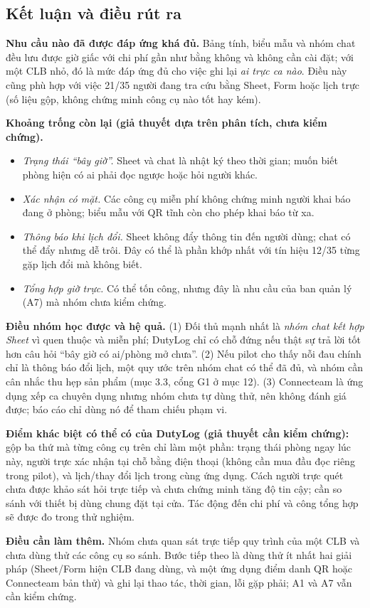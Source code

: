 \subsection{Kết luận và điều rút ra}
\textbf{Nhu cầu nào đã được đáp ứng khá đủ.} Bảng tính, biểu mẫu và nhóm chat đều lưu được giờ giấc với chi phí gần như bằng không và không cần cài đặt; với một CLB nhỏ, đó là mức đáp ứng đủ cho việc ghi lại \emph{ai trực ca nào}. Điều này cũng phù hợp với việc 21/35 người đang tra cứu bằng Sheet, Form hoặc lịch trực (số liệu gộp, không chứng minh công cụ nào tốt hay kém).

\textbf{Khoảng trống còn lại (giả thuyết dựa trên phân tích, chưa kiểm chứng).}
\begin{itemize}[nosep]
\item \emph{Trạng thái ``bây giờ''.} Sheet và chat là nhật ký theo thời gian; muốn biết phòng hiện có ai phải đọc ngược hoặc hỏi người khác.
\item \emph{Xác nhận có mặt.} Các công cụ miễn phí không chứng minh người khai báo đang ở phòng; biểu mẫu với QR tĩnh còn cho phép khai báo từ xa.
\item \emph{Thông báo khi lịch đổi.} Sheet không đẩy thông tin đến người dùng; chat có thể đẩy nhưng dễ trôi. Đây có thể là phần khớp nhất với tín hiệu 12/35 từng gặp lịch đổi mà không biết.
\item \emph{Tổng hợp giờ trực.} Có thể tốn công, nhưng đây là nhu cầu của ban quản lý (A7) mà nhóm chưa kiểm chứng.
\end{itemize}

\textbf{Điều nhóm học được và hệ quả.} (1) Đối thủ mạnh nhất là \emph{nhóm chat kết hợp Sheet} vì quen thuộc và miễn phí; DutyLog chỉ có chỗ đứng nếu thật sự trả lời tốt hơn câu hỏi ``bây giờ có ai/phòng mở chưa''. (2) Nếu pilot cho thấy nỗi đau chính chỉ là thông báo đổi lịch, một quy ước trên nhóm chat có thể đã đủ, và nhóm cần cân nhắc thu hẹp sản phẩm (mục 3.3, cổng G1 ở mục 12). (3) Connecteam là ứng dụng xếp ca chuyên dụng nhưng nhóm chưa tự dùng thử, nên không đánh giá được; báo cáo chỉ dùng nó để tham chiếu phạm vi.

\textbf{Điểm khác biệt có thể có của DutyLog (giả thuyết cần kiểm chứng):} gộp ba thứ mà từng công cụ trên chỉ làm một phần: trạng thái phòng ngay lúc này, người trực xác nhận tại chỗ bằng điện thoại (không cần mua đầu đọc riêng trong pilot), và lịch/thay đổi lịch trong cùng ứng dụng. Cách người trực quét chưa được khảo sát hỏi trực tiếp và chưa chứng minh tăng độ tin cậy; cần so sánh với thiết bị dùng chung đặt tại cửa. Tác động đến chi phí và công tổng hợp sẽ được đo trong thử nghiệm.

\textbf{Điều cần làm thêm.} Nhóm chưa quan sát trực tiếp quy trình của một CLB và chưa dùng thử các công cụ so sánh. Bước tiếp theo là dùng thử ít nhất hai giải pháp (Sheet/Form hiện CLB đang dùng, và một ứng dụng điểm danh QR hoặc Connecteam bản thử) và ghi lại thao tác, thời gian, lỗi gặp phải; A1 và A7 vẫn cần kiểm chứng.

